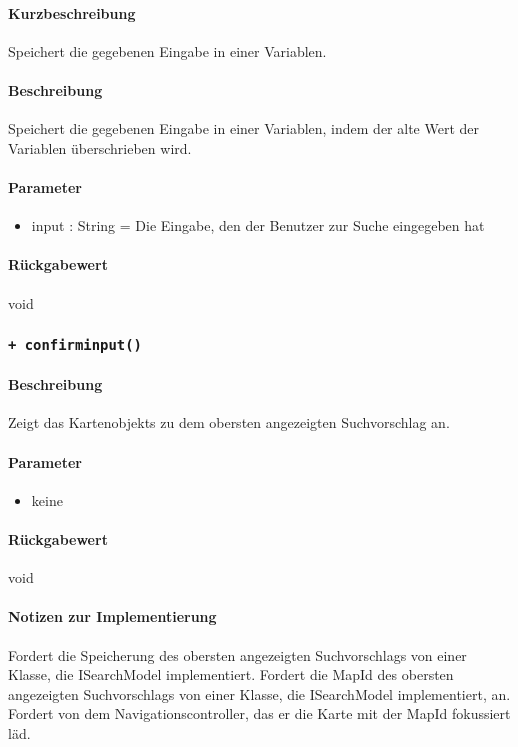 \paragraph*{Kurzbeschreibung}
Speichert die gegebenen Eingabe in einer Variablen.
\paragraph*{Beschreibung}
Speichert die gegebenen Eingabe in einer Variablen, indem der alte Wert der Variablen überschrieben wird.
\paragraph*{Parameter}
\begin{itemize}
    \item input : String = Die Eingabe, den der Benutzer zur Suche eingegeben hat
\end{itemize}
\paragraph*{Rückgabewert}
void

\subsubsection{\texttt{+ confirminput()}}%
\paragraph*{Beschreibung}
Zeigt das Kartenobjekts zu dem obersten angezeigten Suchvorschlag an.
\paragraph*{Parameter}
\begin{itemize}
    \item keine
\end{itemize}
\paragraph*{Rückgabewert}
void
\paragraph*{Notizen zur Implementierung}
Fordert die Speicherung des obersten angezeigten Suchvorschlags von einer Klasse, die ISearchModel implementiert.
Fordert die MapId des obersten angezeigten Suchvorschlags von einer Klasse, die ISearchModel implementiert, an.
Fordert von dem Navigationscontroller, das er die Karte mit der MapId fokussiert läd.

